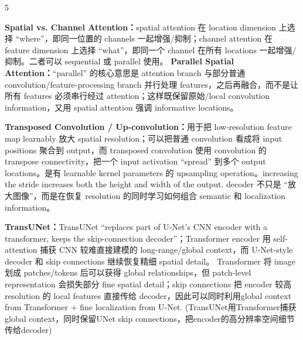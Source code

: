 \documentclass[a4paper, landscape]{article}
\begin{document}
\begin{multicols}{5}
\par \textbf{Spatial vs. Channel Attention：}spatial attention 在 location dimension 上选择 ``where''，即同一位置的 channels 一起增强/抑制；channel attention 在 feature dimension 上选择 ``what''，即同一个 channel 在所有 locations 一起增强/抑制。二者可以 sequential 或 parallel 使用。
\textbf{Parallel Spatial Attention：}``parallel'' 的核心意思是 attention branch 与部分普通 convolution/feature-processing branch 并行处理 features，之后再融合，而不是让所有 features 必须串行经过 attention；这样既保留原始/local convolution information，又用 spatial attention 强调 informative locations。
\par \textbf{Transposed Convolution / Up-convolution：}用于把 low-resolution feature map learnably 放大 spatial resolution；可以把普通 convolution 看成将 input positions 聚合到 output，而 transposed convolution 使用 convolution 的 transpose connectivity，把一个 input activation ``spread'' 到多个 output locations。是有 learnable kernel parameters 的 upsampling operation。increasing the stride increases both the height and width of the output. decoder 不只是 ``放大图像''，而是在恢复 resolution 的同时学习如何组合 semantic 和 localization information。

\par \textbf{TransUNet：}TransUNet ``replaces part of U-Net's CNN encoder with a transformer, keeps the skip-connection decoder''；Transformer encoder 用 self-attention 捕获 CNN 较难直接建模的 long-range/global context，而 U-Net-style decoder 和 skip connections 继续恢复精细 spatial detail。
Transformer 将 image 划成 patches/tokens 后可以获得 global relationships，但 patch-level representation 会损失部分 fine spatial detail；skip connections 把 encoder 较高 resolution 的 local features 直接传给 decoder，因此可以同时利用global context from Transformer + fine localization from U-Net. (TransUNet用Transformer捕获global context，同时保留UNet skip connections，把encoder的高分辨率空间细节传给decoder)


\end{multicols}
\end{document}
